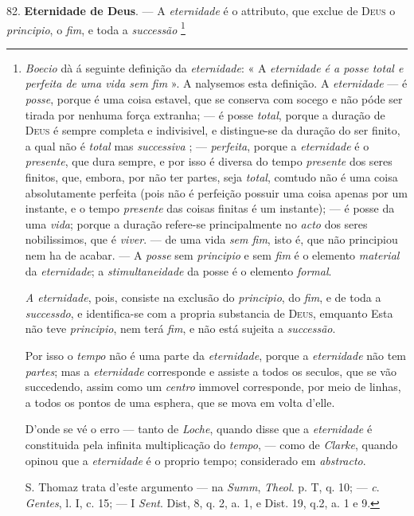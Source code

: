  82. \textbf{Eternidade de Deus}. --- A \emph{eternidade} é o attributo, que exclue de \textsc{Deus} o \emph{principio}, o \emph{fim}, e toda a \emph{successão} \footnote{\emph{Boecio} dà á seguinte definição da \emph{eternidade}: « A \emph{eternidade é a posse total e perfeita de uma vida sem fim} ». A nalysemos esta definição. A \emph{eternidade} --- é \emph{posse}, porque é uma coisa estavel, que se conserva com socego e não póde ser tirada por nenhuma força extranha; --- é posse \emph{total}, porque a duração de \textsc{Deus} é sempre completa e indivisivel, e distingue-se da duração do ser finito, a qual não é \emph{total} mas \emph{successiva} ; --- \emph{perfeita}, porque a \emph{eternidade} é o \emph{presente}, que dura sempre, e por isso é diversa do tempo \emph{presente} dos seres finitos, que, embora, por não ter partes, seja \emph{total}, comtudo não é uma coisa absolutamente perfeita (pois não é perfeição possuir uma coisa apenas por um instante, e o tempo \emph{presente} das coisas finitas é um instante); --- é posse da uma \emph{vida}; porque a duração refere-se principalmente no \emph{acto} dos seres nobilissimos, que é \emph{viver}. --- de uma vida \emph{sem fim}, isto é, que não principiou nem ha de acabar. --- A \emph{posse} sem \emph{principio} e sem \emph{fim} é o elemento \emph{material} da \emph{eternidade}; a \emph{stimultaneidade} da posse é o elemento \emph{formal}.\par \emph{A eternidade}, pois, consiste na exclusão do \emph{principio}, do \emph{fim}, e de toda a \emph{successdo}, e identifica-se com a propria substancia de \textsc{Deus}, emquanto Esta não teve \emph{principio}, nem terá \emph{fim}, e não está sujeita a \emph{successão}.\par Por isso o \emph{tempo} não é uma parte da \emph{eternidade}, porque a \emph{eternidade} não tem \emph{partes}; mas a \emph{eternidade} corresponde e assiste a todos os seculos, que se vão succedendo, assim como um \emph{centro} immovel corresponde, por meio de linhas, a todos os pontos de uma esphera, que se mova em volta d'elle.\par D'onde se vé o erro --- tanto de \emph{Loche}, quando disse que a \emph{eternidade} é constituida pela infinita multiplicação do \emph{tempo}, --- como de \emph{Clarke}, quando opinou que a \emph{eternidade} é o proprio tempo; considerado em \emph{abstracto}.\par S. Thomaz trata d'este argumento --- na \emph{Summ}, \emph{Theol}. p. T, q. 10; --- \emph{c}. \emph{Gentes}, l. I, c. 15; --- I \emph{Sent}. Dist, 8, q. 2, a. 1, e Dist. 19, q.2, a. 1 e 9.}

